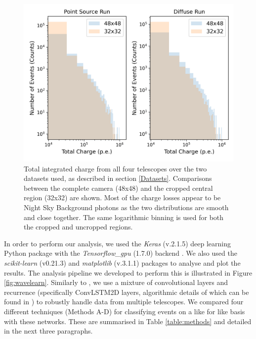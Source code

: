 \begin{figure}
  \centering
  \includegraphics[width=0.7
  \textwidth]{figures/chargehistlog.png}
  \caption{Total integrated charge from all four telescopes over the two datasets used, as described in section \ref{Datasets}. Comparisons between the complete camera (48x48) and the cropped central region (32x32) are shown.  Most of the charge losses appear to be Night Sky Background photons as the two distributions are smooth and close together. The same logarithmic binning is used for both the cropped and uncropped regions.}
  \label{fig:chargehist}
\end{figure}
In order to perform our analysis, we used the \textit{Keras} (v.2.1.5) \cite{Keras} deep learning Python package with the \textit{Tensorflow\_gpu} (1.7.0) backend \cite{tensorflow}. We also used the \textit{scikit-learn} \cite{scikit} (v0.21.3) and \textit{matplotlib} (v.3.1.1) \cite{matplotlib} packages to analyse and plot the results. The analysis pipeline we developed to perform this is illustrated in Figure \ref{fig:wavelearn}. Similarly to \cite{Shilon}, we use a mixture of convolutional layers and recurrence (specifically ConvLSTM2D layers, algorithmic details of which can be found in \cite{shi}) to robustly handle data from multiple telescopes. We compared four different techniques (Methods A-D) for classifying events on a like for like basis with these networks. These are summarised in Table \ref{table:methods} and detailed in the next three paragraphs. 

